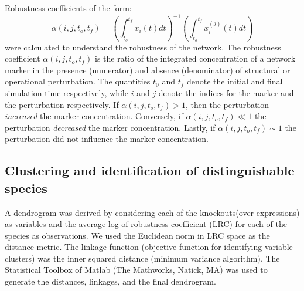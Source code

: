 \documentclass[fleqn,10pt]{wlscirep}
\begin{document}
Robustness coefficients of the form:
\begin{equation}
\alpha\left(i,j,t_{o},t_{f}\right)=\left(\displaystyle\int_{t_{o}}^{t_{f}}x_{i}\left(t\right)dt\right)^{-1}\left(\displaystyle\int_{t_{o}}^{t_{f}}x^{(j)}_{i}\left(t\right)dt\right)
\end{equation}
were calculated to understand the robustness of the network.
The robustness coefficient $\alpha\left(i,j,t_{o},t_{f}\right)$ is the ratio of the integrated concentration of a network marker
in the presence (numerator) and absence (denominator) of structural or operational perturbation.
The quantities $t_0$ and $t_f$ denote the initial and final simulation time respectively, while
$i$ and $j$ denote the indices for the marker and the perturbation respectively.
If $\alpha\left(i,j,t_{o},t_{f}\right)>1$, then the perturbation \emph{increased} the marker concentration. Conversely,
if $\alpha\left(i,j,t_{o},t_{f}\right)\ll{1}$ the perturbation \emph{decreased} the marker concentration. Lastly, if
$\alpha\left(i,j,t_{o},t_{f}\right)\sim{1}$ the perturbation did not influence the marker concentration.

\subsection*{Clustering and identification of distinguishable species}
A dendrogram was derived by considering each of the knockouts(over-expressions) as variables and the average log of robustness coefficient (LRC) for each of the species as observations.
We used the Euclidean norm in LRC space as the distance metric. The linkage function (objective function for identifying variable clusters) was the inner squared distance (minimum variance algorithm).
The Statistical Toolbox of Matlab (The Mathworks, Natick, MA) was used to generate the distances, linkages, and the final dendrogram.
\end{document}
